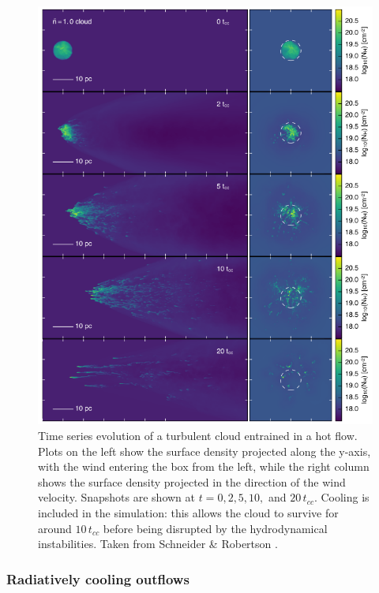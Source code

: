 \begin{figure}
    \centering
    \includegraphics[width=1.0\textwidth]{plots/cloud_crushing.PNG}
    \caption{Time series evolution of a turbulent cloud entrained in a hot flow. Plots on the left show the surface density projected along the y-axis, with the wind entering the box from the left, while the right column shows the surface density projected in the direction of the wind velocity. Snapshots are shown at $t = 0, 2, 5, 10,$ and $20\,t_{cc}$. Cooling is included in the simulation: this allows the cloud to survive for around $10\,t_{cc}$ before being disrupted by the hydrodynamical instabilities. Taken from Schneider \& Robertson \citep{schneider2017hydrodynamical}.
    }
    \label{fig:cloud_crushing}
\end{figure}


\subsubsection{Radiatively cooling outflows} \label{sec:thompson_model}


